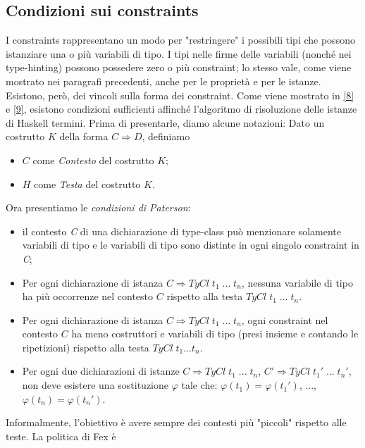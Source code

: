 \documentclass[10pt,a4paper]{article}
\begin{document}
\hypertarget{Condizioni sui constraints}{\subsection{Condizioni sui constraints}}
I constraints rappresentano un modo per "restringere" i possibili tipi che possono istanziare una o più variabili di
tipo. I tipi nelle firme delle variabili (nonché nei type-hinting) possono possedere zero o più constraint; lo stesso
vale, come viene mostrato nei paragrafi precedenti, anche per le proprietà e per le istanze. Esistono, però, dei
vincoli sulla forma dei constraint. Come viene mostrato in \hyperlink{bibl8}{[8]} e \hyperlink{bibl9}{[9]}, esistono
condizioni sufficienti
affinché l'algoritmo di risoluzione delle istanze di Haskell termini. Prima di presentarle, diamo alcune notazioni:
\newline Dato un costrutto $ K $ della forma $ C \Rightarrow D $, definiamo
\begin{itemize}
    \item $ C $ come \textit{Contesto} del costrutto $ K $;
    \item $ H $ come \textit{Testa} del costrutto $ K $.
\end{itemize}
Ora presentiamo le \textit{condizioni di Paterson}:
\begin{itemize}
    \item il contesto \textit{C} di una dichiarazione di type-class può menzionare solamente variabili di tipo e
    le variabili di tipo sono distinte in ogni singolo constraint in \textit{C};
    \item Per ogni dichiarazione di istanza $ C \Rightarrow TyCl \; t_1 \; ... \; t_n $, nessuna variabile di tipo ha
    più occorrenze nel contesto $ C $ rispetto alla testa $ TyCl \; t_1 \; ... \; t_n $.
    \item Per ogni dichiarazione di istanza $ C \Rightarrow TyCl \; t_1 \; ... \; t_n $, ogni constraint nel contesto
    $ C $ ha meno costruttori e variabili di tipo (presi insieme e contando le ripetizioni) rispetto alla testa
    $ TyCl \; t_1 ... t_n $.
    \item Per ogni due dichiarazioni di istanze $ C \Rightarrow TyCl \; t_1 \; ... \; t_n $,
    $ C' \Rightarrow TyCl \; t_1' \; ... \; t_n' $, non deve esistere una sostituzione $ \varphi $ tale che:
    $ \varphi(t_1) = \varphi(t_1') $, ..., $ \varphi(t_n) = \varphi(t_n') $.
\end{itemize}
Informalmente, l'obiettivo è avere sempre dei contesti più "piccoli" rispetto alle teste. La politica di Fex è
\end{document}
